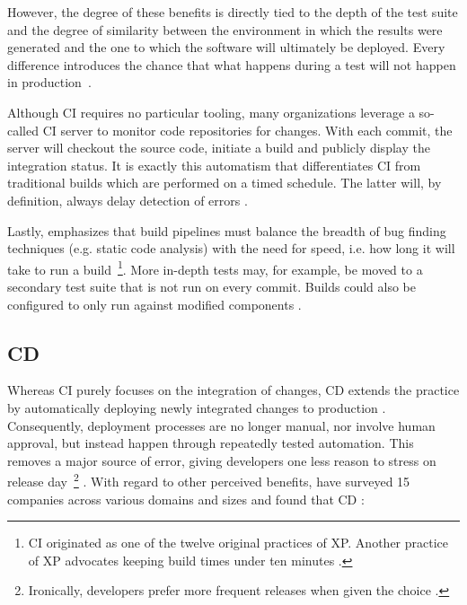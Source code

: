 \begin{appendices}
However, the degree of these benefits is directly tied to the depth of the test suite and the degree of similarity between the environment in which the results were generated and the one to which the software will ultimately be deployed. Every difference introduces the chance that what happens during a test will not happen in production~\cite[pp.~9,~12]{fowler2006continuous}.

Although \ac{CI} requires no particular tooling, many organizations leverage a so-called \ac{CI} server to monitor code repositories for changes. With each commit, the server will checkout the source code, initiate a build and publicly display the integration status. It is exactly this automatism that differentiates \ac{CI} from traditional builds which are performed on a timed schedule. The latter will, by definition, always delay detection of errors \cite[pp.~7,~10]{fowler2006continuous}.

Lastly, \citeauthor{fowler2006continuous} emphasizes that build pipelines must balance the breadth of bug finding techniques (e.g. static code analysis) with the need for speed, i.e. how long it will take to run a build~\footnote{\ac{CI} originated as one of the twelve original practices of \ac*{XP}. Another practice of \acs*{XP} advocates keeping build times under ten minutes \cite[pp.~2,~8]{fowler2006continuous}.}. More in-depth tests may, for example, be moved to a secondary test suite that is not run on every commit. Builds could also be configured to only run against modified components \cite[pp.~5,~8]{fowler2006continuous}.


\subsection{\acl{CD}}
\label{sec:continuous-deployment}

Whereas \ac{CI} purely focuses on the integration of changes, \ac{CD} extends the practice by automatically deploying newly integrated changes to production \cite[p.~64]{leppanen2015highways} \cite[p.~21]{savor2016continuous}. Consequently, deployment processes are no longer manual, nor involve human approval, but instead happen through repeatedly tested automation. This removes a major source of error, giving developers one less reason to stress on release day~\footnote{Ironically, developers prefer more frequent releases when given the choice \cite[p.~21]{savor2016continuous}.} \cite[pp.~79--80]{virmani2015understanding} \cite[p.~53]{chen2015continuous}. With regard to other perceived benefits, \citeauthor{leppanen2015highways} have surveyed 15 companies across various domains and sizes and found that \ac{CD} \cite[pp.~66--67]{leppanen2015highways}:


\end{appendices}
